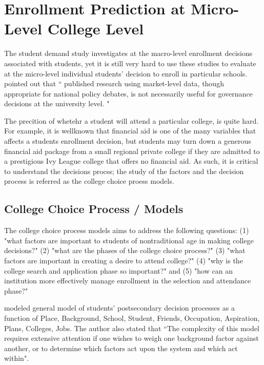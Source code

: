 \documentclass[12pt,english]{report}
\begin{document}
\section{Enrollment Prediction at Micro-Level College Level}
The student demand study investigates at the macro-level enrollment decisions
associated with students, yet it is still very hard to use these studies to
evaluate at the micro-level individual students' decision to enroll in
particular schools. \citet{Carter2011} pointed out that `` published research
using market-level data, though appropriate for national policy debates, is not
necessarily useful for governance decisions at the university level. "

The precition of whetehr a student  will attend a particular college, is quite
hard.  For example,  it is wellknown that financial aid is one of the many
variables that affects a students enrollment decision, but students may turn
down a generous financial aid package from a small regional private college if
they are admitted to a prestigious Ivy League college that offers no financial
aid.  As such, it is critical to understand the decisions procss; the study of
the factors and the decision process is referred as the college choice proess
models.

\subsection{College Choice Process / Models} 
The college choice process models aims to address the following questions: (1)
"what factors are important to students of nontraditional age in making college
decisions?" (2) "what are the phases of the college choice process?" (3) "what
factors are important in creating a desire to attend college?" (4) "why is the
college search and application phase so important?" and (5) "how can an
institution more effectively manage enrollment in the selection and attendance
phase?" \citep{Paulsen1990}

\citet{Jackson1978}  modeled general model of students' postsecondary decision
processes as a function of Place, Background, School, Student, Friends,
Occupation, Aspiration, Plans, Colleges, Jobs.  The author also stated that
``The complexity of this model requires extensive attention if one wishes to
weigh one background factor against another, or to determine which  factors act
upon the system and which act within".
\end{document}
